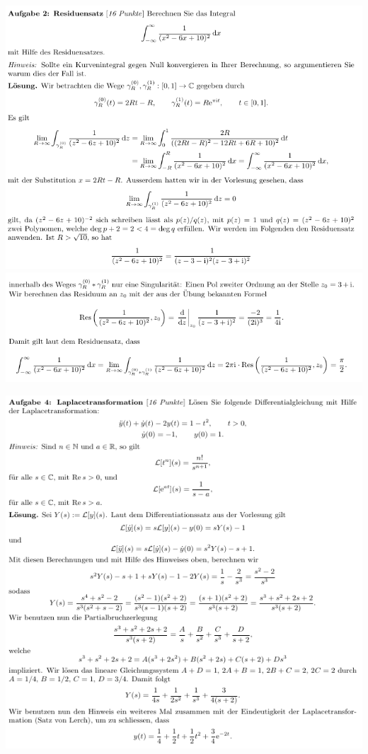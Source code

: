 
\includegraphics[width=1\textwidth]{images/img_koma/example_1.1_hs19.png}
\includegraphics[width=1\textwidth]{images/img_koma/example_1.2_hs19.png}

\includegraphics[width=1\textwidth]{images/img_koma/example_1.3_hs19.png}

